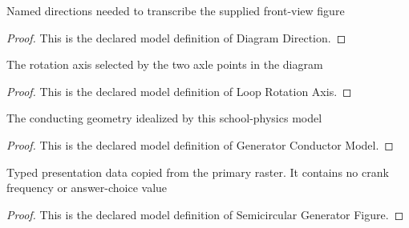 \begin{definition}
  \label{def:physics:phyx-mini-0932:phyxminiproblems-problemphyxmini0932-diagramdirection}
  Named directions needed to transcribe the supplied front-view figure
\end{definition}
\begin{proof}
  This is the declared model definition of Diagram Direction.
\end{proof}
\begin{definition}
  \label{def:physics:phyx-mini-0932:phyxminiproblems-problemphyxmini0932-looprotationaxis}
  The rotation axis selected by the two axle points in the diagram
\end{definition}
\begin{proof}
  This is the declared model definition of Loop Rotation Axis.
\end{proof}
\begin{definition}
  \label{def:physics:phyx-mini-0932:phyxminiproblems-problemphyxmini0932-generatorconductormodel}
  The conducting geometry idealized by this school-physics model
\end{definition}
\begin{proof}
  This is the declared model definition of Generator Conductor Model.
\end{proof}
\begin{definition}
  \label{def:physics:phyx-mini-0932:phyxminiproblems-problemphyxmini0932-semicirculargeneratorfigure}
  Typed presentation data copied from the primary raster. It contains no crank frequency or answer-choice value
\end{definition}
\begin{proof}
  This is the declared model definition of Semicircular Generator Figure.
\end{proof}
